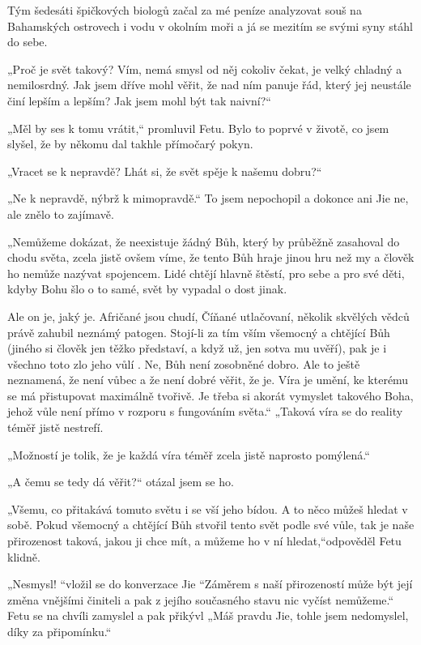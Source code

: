 Tým šedesáti špičkových biologů začal za mé peníze analyzovat souš na Bahamských ostrovech i vodu v okolním moři a já se mezitím se svými syny stáhl do sebe.

„Proč je svět takový? Vím, nemá smysl od něj cokoliv čekat, je velký chladný a nemilosrdný. Jak jsem dříve mohl věřit, že nad ním panuje řád, který jej neustále činí lepším a lepším? Jak jsem mohl být tak naivní?“

„Měl by ses k tomu vrátit,“ promluvil Fetu. Bylo to poprvé v životě, co jsem slyšel, že by někomu dal takhle přímočarý pokyn.

„Vracet se k nepravdě? Lhát si, že svět spěje k našemu dobru?“

„Ne k nepravdě, nýbrž k mimopravdě.“ To jsem nepochopil a dokonce ani Jie ne, ale znělo to zajímavě.

„Nemůžeme dokázat, že neexistuje žádný Bůh, který by průběžně zasahoval do chodu světa, zcela jistě ovšem víme, že tento Bůh hraje jinou hru než my a člověk ho nemůže nazývat spojencem. Lidé chtějí hlavně štěstí, pro sebe a pro své děti, kdyby Bohu šlo o to samé, svět by vypadal o dost jinak.

Ale on je, jaký je. Afričané jsou chudí, Číňané utlačovaní, několik skvělých vědců právě zahubil neznámý patogen. Stojí-li za tím vším všemocný a chtějící Bůh (jiného si člověk jen těžko představí, a když už, jen sotva mu uvěří), pak je i všechno toto zlo jeho vůlí
.
Ne, Bůh není zosobněné dobro. Ale to ještě neznamená, že není vůbec a že není dobré věřit, že je. Víra je umění, ke kterému se má přistupovat maximálně tvořivě. Je třeba si akorát vymyslet takového Boha, jehož vůle není přímo v rozporu s fungováním světa.“
„Taková víra se do reality téměř jistě nestrefí.

„Možností je tolik, že je každá víra téměř zcela jistě naprosto pomýlená.“

„A čemu se tedy dá věřit?“ otázal jsem se ho.

„Všemu, co přitakává tomuto světu i se vší jeho bídou. A to něco můžeš hledat v sobě. Pokud všemocný a chtějící Bůh stvořil tento svět podle své vůle, tak je naše přirozenost taková, jakou ji chce mít, a můžeme ho v ní hledat,“odpověděl Fetu klidně.

„Nesmysl! “vložil se do konverzace Jie “Záměrem s naší přirozeností může být její změna vnějšími činiteli a pak z jejího současného stavu nic vyčíst nemůžeme.“
Fetu se na chvíli zamyslel a pak přikývl „Máš pravdu Jie, tohle jsem nedomyslel, díky za připomínku.“

